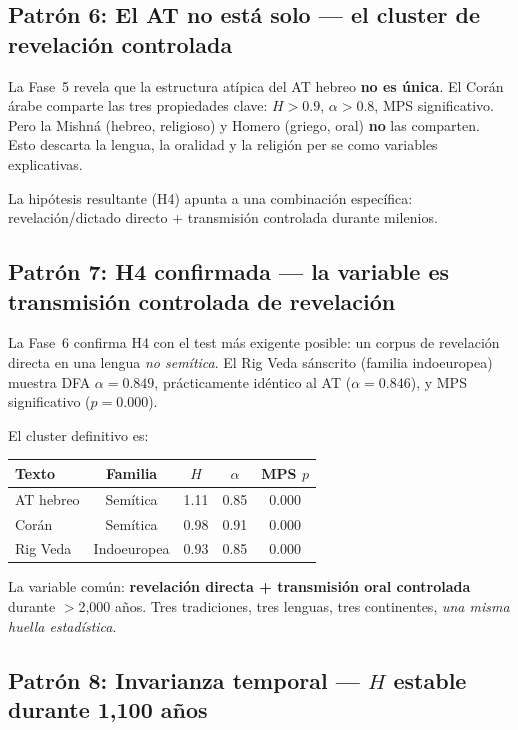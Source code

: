 \documentclass[12pt,a4paper]{article}
\begin{document}
\subsection{Patr\'on 6: El AT no est\'a solo --- el cluster de revelaci\'on controlada}

La Fase~5 revela que la estructura at\'ipica del AT hebreo \textbf{no es \'unica}.
El Cor\'an \'arabe comparte las tres propiedades clave: $H > 0.9$, $\alpha > 0.8$,
MPS significativo. Pero la Mishn\'a (hebreo, religioso) y Homero (griego, oral)
\textbf{no} las comparten. Esto descarta la lengua, la oralidad y la religi\'on per se
como variables explicativas.

La hip\'otesis resultante (H4) apunta a una combinaci\'on espec\'ifica:
revelaci\'on/dictado directo + transmisi\'on controlada durante milenios.

\subsection{Patr\'on 7: H4 confirmada --- la variable es transmisi\'on controlada de revelaci\'on}

La Fase~6 confirma H4 con el test m\'as exigente posible: un corpus de revelaci\'on
directa en una lengua \emph{no sem\'itica}. El Rig Veda s\'anscrito (familia indoeuropea)
muestra DFA $\alpha = 0.849$, pr\'acticamente id\'entico al AT ($\alpha = 0.846$),
y MPS significativo ($p = 0.000$).

El cluster definitivo es:

\begin{center}
\begin{tabular}{lcccc}
\toprule
\textbf{Texto} & \textbf{Familia} & \textbf{$H$} & \textbf{$\alpha$} & \textbf{MPS $p$} \\
\midrule
AT hebreo   & Sem\'itica     & 1.11 & 0.85 & 0.000 \\
Cor\'an      & Sem\'itica     & 0.98 & 0.91 & 0.000 \\
Rig Veda    & Indoeuropea   & 0.93 & 0.85 & 0.000 \\
\bottomrule
\end{tabular}
\end{center}

\noindent
La variable com\'un: \textbf{revelaci\'on directa + transmisi\'on oral controlada}
durante $>$2,000 a\~nos. Tres tradiciones, tres lenguas, tres continentes,
\emph{una misma huella estad\'istica}.

\subsection{Patr\'on 8: Invarianza temporal --- $H$ estable durante 1,100 a\~nos}
\end{document}
